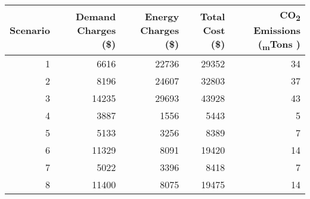 \begin{tabular}{rrrrr}
\toprule
 Scenario &  Demand Charges (\$) &  Energy Charges (\$) &  Total Cost (\$) &  CO\textsubscript{2} Emissions (\textsubscript{m}Tons )\\
\midrule
        1 &                6616 &               22736 &           29352 &         34 \\
        2 &                8196 &               24607 &           32803 &         37 \\
        3 &               14235 &               29693 &           43928 &         43 \\
        4 &                3887 &                1556 &            5443 &          5 \\
        5 &                5133 &                3256 &            8389 &          7 \\
        6 &               11329 &                8091 &           19420 &         14 \\
        7 &                5022 &                3396 &            8418 &          7 \\
        8 &               11400 &                8075 &           19475 &         14 \\
\bottomrule
\end{tabular}
